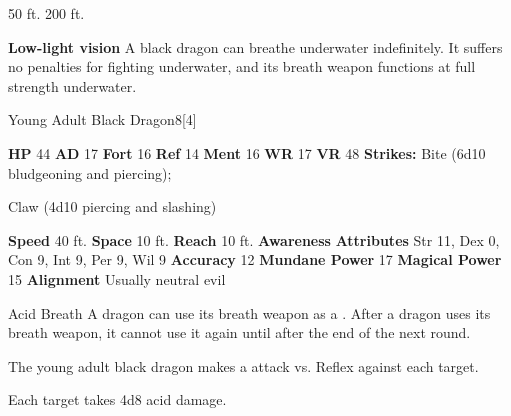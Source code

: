       
       50 ft.
     200 ft.
    \par\noindent\textbf{Low-light vision}
        A black dragon can breathe underwater indefinitely.
        It suffers no penalties for fighting underwater, and its breath weapon functions at full strength underwater.
  

  \begin{monsubsection}{Young Adult Black Dragon}{8}[4]
    \vspace{-1em}\vspace{-1em}
    \vspace{0em}

    
    

    \begin{spellcontent}
      \begin{spelltargetinginfo}
        \pari \textbf{HP} 44 \monsep
          \textbf{AD} 17 \monsep
          \textbf{Fort} 16 \monsep
          \textbf{Ref} 14 \monsep
          \textbf{Ment} 16
        \pari \textbf{WR} 17 \monsep
        \textbf{VR} 48
        \pari \textbf{Strikes:}
            Bite  (6d10 bludgeoning and piercing);
\par Claw  (4d10 piercing and slashing)
      \end{spelltargetinginfo}
    \end{spellcontent}
    \begin{monsterfooter}
      \pari \textbf{Speed} 40 ft. \monsep
        \textbf{Space} 10 ft. \monsep
        \textbf{Reach} 10 ft.
      \pari \textbf{Awareness} 
      \pari \textbf{Attributes}
        Str 11, Dex 0,
        Con 9, Int 9,
        Per 9, Wil 9
      \pari \textbf{Accuracy} 12 \monsep
        \textbf{Mundane Power} 17 \monsep
      \textbf{Magical Power} 15
      \pari \textbf{Alignment} Usually neutral evil
    \end{monsterfooter}
  \end{monsubsection}
  \begin{freeability}{Acid Breath}
      A dragon can use its breath weapon as a .
      After a dragon uses its breath weapon, it cannot use it again until after the end of the next round.
      \par The young adult black dragon makes a  attack
        vs. Reflex against each target.
    
    \hit Each target takes 4d8 acid damage.
    \end{freeability}
  

